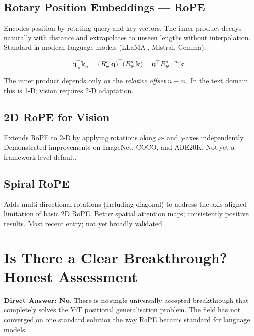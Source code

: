 \documentclass[12pt,a4paper]{article}
\begin{document}
\subsection{Rotary Position Embeddings --- RoPE \cite{rope2021}}
Encodes position by rotating query and key vectors. The inner product decays
naturally with distance and extrapolates to unseen lengths without
interpolation. Standard in modern language models (LLaMA \cite{llama2023},
Mistral, Gemma).

\begin{equation}
  \mathbf{q}_m^\top \mathbf{k}_n
  = \bigl(R_\Theta^m\,\mathbf{q}\bigr)^\top
    \bigl(R_\Theta^n\,\mathbf{k}\bigr)
  = \mathbf{q}^\top R_\Theta^{n-m}\,\mathbf{k}
\end{equation}

The inner product depends only on the \emph{relative offset} $n-m$. In the
text domain this is 1-D; vision requires 2-D adaptation.

\subsection{2D RoPE for Vision \cite{rope_vit2024}}
Extends RoPE to 2-D by applying rotations along $x$- and $y$-axes
independently. Demonstrated improvements on ImageNet, COCO, and ADE20K. Not
yet a framework-level default.

\subsection{Spiral RoPE \cite{spiral2026}}
Adds multi-directional rotations (including diagonal) to address the
axis-aligned limitation of basic 2D RoPE. Better spatial attention maps;
consistently positive results. Most recent entry; not yet broadly validated.

\section{Is There a Clear Breakthrough? Honest Assessment}
\label{sec:breakthrough}

\begin{warning}
  \textbf{Direct Answer: No.} There is no single universally accepted
  breakthrough that completely solves the ViT positional generalisation
  problem. The field has not converged on one standard solution the way RoPE
  became standard for language models.
\end{warning}
\end{document}
